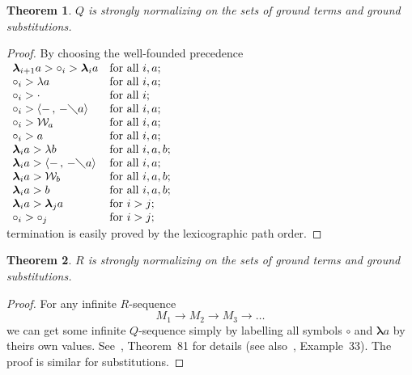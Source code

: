 \documentclass[11pt]{amsart}
\theoremstyle{plain}
\newtheorem{theorem}{Theorem}[section]
\theoremstyle{definition}
\theoremstyle{remark}
\numberwithin{equation}{section}
\newcommand{\ci}{\circ}
\newcommand{\mi}{\,,\,}
\newcommand{\is}{\diagdown}
\newcommand{\arrow}{\rightarrow}
\newcommand{\la}{\langle}
\newcommand{\ra}{\rangle}
\newcommand{\x}{a}
\newcommand{\y}{b}
\renewcommand{\pi}{\mathcal{W}}
\begin{document}
\newpage
\begin{theorem}\label{normalizing}$Q$ is strongly normalizing on the sets of ground
terms and ground substitutions.
\end{theorem}
\begin{proof}
By choosing the  well-founded precedence\\
$
\begin{array}{ll}
\boldsymbol{\lambda}_{i+1} \x>\ci_i>\boldsymbol{\lambda}_i
\x & \text{for all } i,\x;\\
\ci_i>\lambda \x & \text{for all } i,\x;\\
\ci_i>\cdot &\text{for all } i;\\
\ci_i>\la -\mi -\is \x\ra & \text{for all } i,\x;\\
\ci_i>\pi_{\x} & \text{for all } i,\x;\\
\ci_i> \x & \text{for all } i,\x;\\
\boldsymbol{\lambda}_i \x>\lambda \y & \text{for all } i,\x,\y;\\
\boldsymbol{\lambda}_{i} \x>\la-\mi -\is \x\ra & \text{for all } i,\x;\\
\boldsymbol{\lambda}_{i} \x>\pi_{\y} & \text{for all } i,\x,\y;\\
\boldsymbol{\lambda}_{i} \x> \y & \text{for all } i,\x,\y;\\
 \boldsymbol{\lambda}_i
\x>\boldsymbol{\lambda}_j \x & \text{for }
 i>j; \\
\ci_i>\ci_j & \text{for } i>j;
\end{array}
$\\[5pt]
termination is easily proved by the lexicographic path order.
\end{proof}
\begin{theorem}$R$ is strongly normalizing on the sets of ground
terms and ground substitutions.
\end{theorem}
\begin{proof}
For any infinite $R$-sequence
$$M_1\arrow M_2\arrow M_3\arrow\ldots$$
we can get some infinite $Q$-sequence simply by labelling all
symbols $\circ$ and $\boldsymbol{\lambda} \x$ by theirs own
values. See~\cite{Zantema}, Theorem~81 for details (see
also~\cite{Zantema}, Example~33). The proof  is similar for
substitutions.
\end{proof}
\newpage



\end{document}
